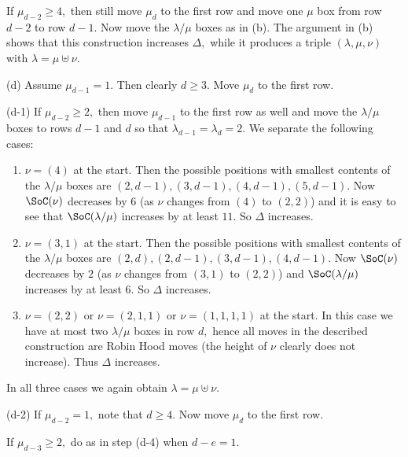 \documentclass[12pt,dvipsnames,accepted=2016-08-18,a4paper,onecolumn]{quantumarticle}
\def\la{\lambda}
\def\la{\lambda}
\numberwithin{equation}{section}
\theoremstyle{definition}
\begin{document}
If $\mu_{d-2}\geq 4,$ then still move  $\mu_d$ to the first row and move one $\mu$ box from row $d-2$ to row $d-1.$ Now move the $\la/\mu$ boxes as in (b). The argument in (b) shows that this construction increases $\Delta,$ while it  produces a triple $(\la,\mu,\nu)$ with $\la = \mu \uplus \nu.$


(d) Assume $\mu_{d-1} = 1.$ Then clearly $d \geq 3.$ Move $\mu_d$ to the first row.

(d-1) If $\mu_{d-2}\geq 2,$ then move $\mu_{d-1}$ to the first row as well and move the $\la/\mu$ boxes to rows $d-1$ and $d$ so that $\la_{d-1}=\la_d = 2.$ We separate the following cases:
\begin{enumerate}
    \item $\nu=(4)$ at the start. Then the possible positions with smallest contents of the  $\la/\mu$ boxes are $(2,d-1),(3,d-1),(4,d-1),(5,d-1).$ Now $\SoC(\nu)$ decreases by $6$ (as $\nu$ changes from $(4)$ to $(2,2)$) and it is easy to see that  $\SoC(\la/\mu)$ increases by at least $11.$ So $\Delta$ increases.
    \item $\nu=(3,1)$ at the start. Then the possible positions with smallest contents of the  $\la/\mu$ boxes are $(2,d),(2,d-1),(3,d-1),(4,d-1).$ Now $\SoC(\nu)$ decreases by $2$ (as $\nu$ changes from $(3,1)$ to $(2,2)$) and  $\SoC(\la/\mu)$ increases by at least $6.$ So $\Delta$  increases.
    \item $\nu=(2,2)$ or $\nu=(2,1,1)$ or $\nu=(1,1,1,1)$ at the start.  In this case we have at most two $\la/\mu$ boxes in row $d,$ hence all moves in the described construction are Robin Hood moves (the height of $\nu$ clearly does not increase). Thus $\Delta$ increases.
\end{enumerate}
In all three cases we again obtain $\la = \mu \uplus \nu.$
\vspace{3mm}

(d-2) If $\mu_{d-2} = 1,$ note that $d\geq4.$ Now move $\mu_d$ to the first row.

If $\mu_{d-3} \geq 2,$ do as in step (d-4) when $d-e=1.$
\end{document}
